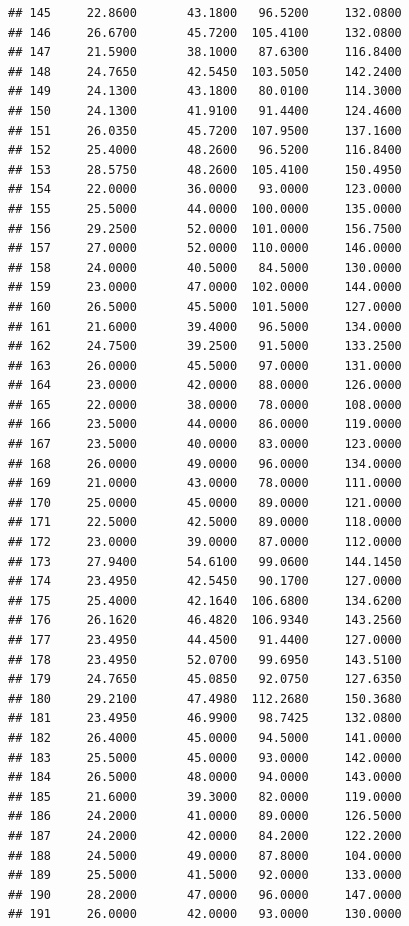 \documentclass[]{article}
\begin{document}
\begin{verbatim}
## 145     22.8600       43.1800   96.5200     132.0800
## 146     26.6700       45.7200  105.4100     132.0800
## 147     21.5900       38.1000   87.6300     116.8400
## 148     24.7650       42.5450  103.5050     142.2400
## 149     24.1300       43.1800   80.0100     114.3000
## 150     24.1300       41.9100   91.4400     124.4600
## 151     26.0350       45.7200  107.9500     137.1600
## 152     25.4000       48.2600   96.5200     116.8400
## 153     28.5750       48.2600  105.4100     150.4950
## 154     22.0000       36.0000   93.0000     123.0000
## 155     25.5000       44.0000  100.0000     135.0000
## 156     29.2500       52.0000  101.0000     156.7500
## 157     27.0000       52.0000  110.0000     146.0000
## 158     24.0000       40.5000   84.5000     130.0000
## 159     23.0000       47.0000  102.0000     144.0000
## 160     26.5000       45.5000  101.5000     127.0000
## 161     21.6000       39.4000   96.5000     134.0000
## 162     24.7500       39.2500   91.5000     133.2500
## 163     26.0000       45.5000   97.0000     131.0000
## 164     23.0000       42.0000   88.0000     126.0000
## 165     22.0000       38.0000   78.0000     108.0000
## 166     23.5000       44.0000   86.0000     119.0000
## 167     23.5000       40.0000   83.0000     123.0000
## 168     26.0000       49.0000   96.0000     134.0000
## 169     21.0000       43.0000   78.0000     111.0000
## 170     25.0000       45.0000   89.0000     121.0000
## 171     22.5000       42.5000   89.0000     118.0000
## 172     23.0000       39.0000   87.0000     112.0000
## 173     27.9400       54.6100   99.0600     144.1450
## 174     23.4950       42.5450   90.1700     127.0000
## 175     25.4000       42.1640  106.6800     134.6200
## 176     26.1620       46.4820  106.9340     143.2560
## 177     23.4950       44.4500   91.4400     127.0000
## 178     23.4950       52.0700   99.6950     143.5100
## 179     24.7650       45.0850   92.0750     127.6350
## 180     29.2100       47.4980  112.2680     150.3680
## 181     23.4950       46.9900   98.7425     132.0800
## 182     26.4000       45.0000   94.5000     141.0000
## 183     25.5000       45.0000   93.0000     142.0000
## 184     26.5000       48.0000   94.0000     143.0000
## 185     21.6000       39.3000   82.0000     119.0000
## 186     24.2000       41.0000   89.0000     126.5000
## 187     24.2000       42.0000   84.2000     122.2000
## 188     24.5000       49.0000   87.8000     104.0000
## 189     25.5000       41.5000   92.0000     133.0000
## 190     28.2000       47.0000   96.0000     147.0000
## 191     26.0000       42.0000   93.0000     130.0000

\end{verbatim}
\end{document}
